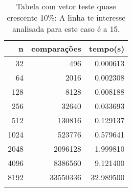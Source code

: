 \begin{table}[ht]
\centering
\begin{tabular}{rrr} \toprule
        n &    comparações &       tempo(s) \\ \midrule
      32  &            496 &      0.000613 \\
      64  &           2016 &      0.002308 \\
     128  &           8128 &      0.008188 \\
     256  &          32640 &      0.033693 \\
     512  &         130816 &      0.129137 \\
    1024  &         523776 &      0.579641 \\
    2048  &        2096128 &      1.999810 \\
    4096  &        8386560 &      9.121400 \\
    8192  &       33550336 &     32.989500 \\
\bottomrule\addlinespace
\end{tabular}
\caption{Tabela com vetor teste quase crescente 10\%: A linha te interesse analisada para este caso é a 15.}
\label{tab:selectionsortQuaseCresc10}
\end{table}
